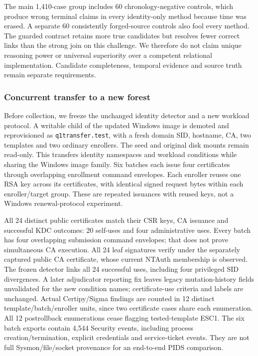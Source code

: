 

The main 1,410-case group includes 60 chronology-negative controls, which produce wrong terminal claims in every identity-only method because time was erased. A separate 60 consistently forged-source controls also fool every method. The guarded contract retains more true candidates but resolves fewer correct links than the strong join on this challenge. We therefore do not claim unique reasoning power or universal superiority over a competent relational implementation. Candidate completeness, temporal evidence and source truth remain separate requirements.

\subsubsection{Concurrent transfer to a new forest}
Before collection, we freeze the unchanged identity detector and a new workload protocol. A writable child of the updated Windows image is demoted and reprovisioned as \texttt{q1transfer.test}, with a fresh domain SID, hostname, CA, two templates and two ordinary enrollers. The seed and original disk mounts remain read-only. This transfers identity namespaces and workload conditions while sharing the Windows image family. Six batches each issue four certificates through overlapping enrollment command envelopes. Each enroller reuses one RSA key across its certificates, with identical signed request bytes within each enroller/target group. These are repeated issuances with reused keys, not a Windows renewal-protocol experiment.

All 24 distinct public certificates match their CSR keys, CA issuance and successful KDC outcomes: 20 self-uses and four administrative uses. Every batch has four overlapping submission command envelopes; that does not prove simultaneous CA execution. All 24 leaf signatures verify under the separately captured public CA certificate, whose current NTAuth membership is observed. The frozen detector links all 24 successful uses, including four privileged SID divergences. A later adjudicator reporting fix leaves legacy mutation-history fields unvalidated for the new condition names; certificate-use criteria and labels are unchanged. Actual Certipy/Sigma findings are counted in 12 distinct template/batch/enroller units, since two certificate cases share each enumeration. All 12 postrollback enumerations cease flagging tested-template ESC1. The six batch exports contain 4,544 Security events, including process creation/termination, explicit credentials and service-ticket events. They are not full Sysmon/file/socket provenance for an end-to-end PIDS comparison.

